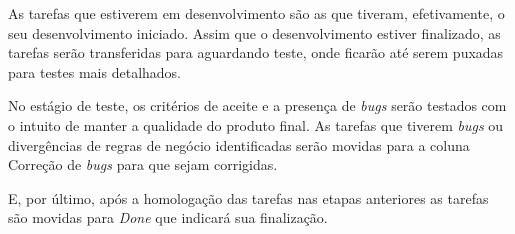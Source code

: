 As tarefas que estiverem em desenvolvimento são as que tiveram, efetivamente, o seu 
desenvolvimento iniciado. Assim que o desenvolvimento estiver finalizado, as tarefas 
serão transferidas para aguardando teste, onde ficarão até serem puxadas para testes 
mais detalhados.

No estágio de teste, os critérios de aceite e a presença de \textit{bugs} serão 
testados com o intuito de manter a qualidade do produto final. As tarefas que tiverem 
\textit{bugs} ou divergências de regras de negócio identificadas serão movidas para a coluna 
Correção de \textit{bugs} para que sejam corrigidas.

E, por último, após a homologação das tarefas nas etapas anteriores as tarefas 
são movidas para \textit{Done} que indicará sua finalização.
